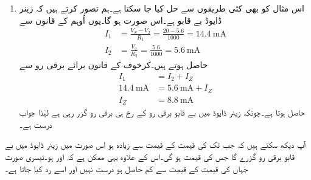 \begin{enumerate}
آئیں اسی مثال کو تیسری مرتبہ یوں حل کریں کہ زینر ڈایوڈ کو بے قابو صورت میں تصور کیا جائے۔چونکہ بے قابو زینر ڈایوڈ پر زینر برقی دباؤ ہی پایا جاتا ہے لہٰذا یوں  ہو گا۔شکل  ب میں  لیتے ہوئے  اُوہم کے قانون سے
\begin{align*}
I_1&=\frac{V_S-V_2}{R_1}=\frac{8-5.6}{1000}=\SI{2.4}{\milli \ampere}\\
I_2&=\frac{V_2}{R_2}=\frac{5.6}{1000}=\SI{5.6}{\milli \ampere}
\end{align*}
حاصل ہوتے ہیں۔زینر ڈایوڈ اور دونوں مزاحمت کے مشترکہ جوڑ پر کرخوف کے قانون برائے برقی رو کے تحت   ہونا چاہئے جس سے
\begin{align*}
I_Z=I_1-I_2=\SI{2.4}{\milli \ampere}-\SI{5.6}{\milli \ampere}=\SI{-3.2}{\milli \ampere}
\end{align*}
حاصل ہوتا ہے۔منفی زینر برقی رو کا مطلب ہے کہ زینر ڈایوڈ میں برقی رو کی سمت شکل  ب  کے الٹ ہے۔ایسا ہونے سے صاف ظاہر ہے کہ زینر ڈایوڈ ہرگز بے قابو حالت میں نہیں ہے۔بے قابو حالت میں برقی رو شکل میں دکھائے رخ میں ہوتا۔یوں ہم نے زینر ڈایوڈ کو غلط حالت میں تصور کیا تھا اور یہ بے قابو صورت میں نہیں ہے۔اس طرح زینر ڈایوڈ منقطع ہی ہے۔یہاں سے ہم پہلے ہی حل کر چکے ہیں۔
\item
اس مثال کو بھی کئی طریقوں سے حل کیا جا سکتا ہے۔ہم تصور کرتے ہیں کہ زینر ڈایوڈ بے قابو ہے۔اس صورت   ہو گا۔یوں  اُوہم کے قانون سے
\begin{align*}
I_1&=\frac{V_S-V_2}{R_1}=\frac{20-5.6}{1000}=\SI{14.4}{\milli \ampere}\\
I_2&=\frac{V_2}{R_2}=\frac{5.6}{1000}=\SI{5.6}{\milli \ampere}
\end{align*}
حاصل ہوتے ہیں۔کرخوف کے قانون برائے برقی رو سے
\begin{align*}
I_1&=I_2+I_Z\\
\SI{14.4}{\milli \ampere}&=\SI{5.6}{\milli \ampere}+I_Z\\
I_Z&=\SI{8.8}{\milli \ampere}
\end{align*}
حاصل ہوتا ہے۔چونکہ زینر ڈایوڈ میں بے قابو برقی رو کے رخ ہی برقی رو گزر رہی ہے لہٰذا جواب درست ہے۔
\end{enumerate}


آپ دیکھ سکتے ہیں کہ جب تک  کی قیمت  کے قیمت سے زیادہ ہو اس صورت میں زینر ڈایوڈ میں بے قابو برقی رو گزرے گا جس کی قیمت   ہو گی۔اس کے علاوہ یہی ممکن ہے کہ    اور    ہو۔تیسری صورت جہاں  کی قیمت  کے قیمت سے کم حاصل ہو درست نہیں اور اسے رد کیا جاتا ہے۔ 

